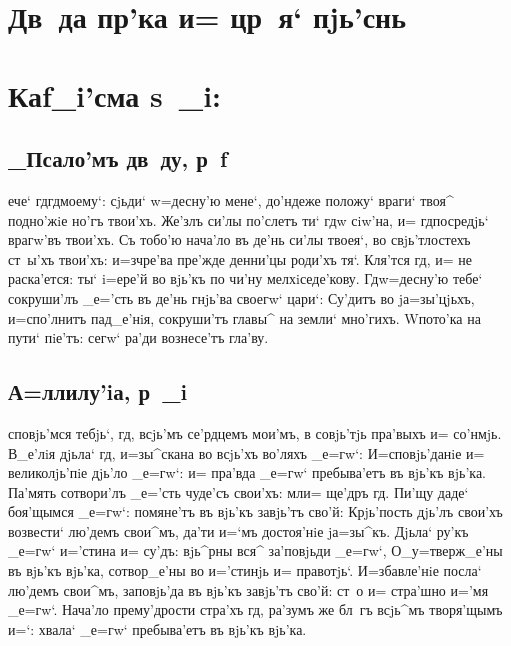 \documentclass[12pt,a6paper,twoside,dvips,civil=antiqua,cs=izhitsa]{hipbook}
\begin{document}
\csendpict

\clearpage
\hdrcrosspage

\section{{\Large Дв~да пр'ка и= цр~я` пjь'снь}}
\section[Каf_i'сма s~_i]{Каf_i'сма s~_i:}

\subsection{_Псало'мъ дв~ду, р~f}

ече` гд гд моему`: сjьди` w=десну'ю мене`, до'ндеже  положу`
враги` твоя^ подно'жiе но'гъ твои'хъ. Же'злъ си'лы по'слетъ ти` гд w\т
сiw'на, и= гд посредjь` врагw'въ твои'хъ. Съ тобо'ю нача'ло въ де'нь
си'лы твоея`, во свjь'тлостехъ ст~ы'хъ твои'хъ: и=з\ъ чре'ва пре'жде денни'цы
роди'хъ тя`. Кля'тся гд, и= не раска'ется: ты` i=ере'й во вjь'къ по чи'ну
мелхiседе'кову. Гд w=десну'ю тебе` сокруши'лъ _е='сть въ де'нь гнjь'ва
своегw` цари`: Су'дитъ во jа=зы'цjьхъ, и=спо'лнитъ пад_е'нiя, сокруши'тъ
главы^ на земли` мно'гихъ. W\т пото'ка на пути` пiе'тъ: сегw` ра'ди вознесе'тъ
гла'ву.

\delimpict

\subsection{А=ллилу'iа, р~_i}

сповjь'мся тебjь`, гд, всjь'мъ се'рдцемъ мои'мъ, в совjь'тjь
пра'выхъ и= со'нмjь. В_е'лiя дjьла` гд, и=зы^скана во всjь'хъ во'ляхъ
_е=гw`: И=сповjь'данiе и= великолjь'пiе дjь'ло _е=гw`: и= пра'вда _е=гw`
пребыва'етъ въ вjь'къ вjь'ка. Па'мять сотвори'лъ _е='сть чуде'съ свои'хъ:
мл и= ще'дръ гд. Пи'щу даде` боя'щымся _е=гw`: помяне'тъ въ вjь'къ
завjь'тъ сво'й: Крjь'пость дjь'лъ свои'хъ возвести` лю'демъ свои^мъ, да'ти
и=`мъ достоя'нiе jа=зы^къ. Дjьла` ру'къ _е=гw` и='стина и= су'дъ: вjь^рны вся^
за'повjьди _е=гw`, О_у=тверж_е'ны въ вjь'къ вjь'ка, сотвор_е'ны во
и='стинjь и= правотjь`. И=збавле'нiе посла` лю'демъ свои^мъ, заповjь'да въ
вjь'къ завjь'тъ сво'й: ст~о и= стра'шно и='мя _е=гw`. Нача'ло
прему'дрости стра'хъ гд, ра'зумъ же бл~гъ всjь^мъ творя'щымъ и=`: хвала`
_е=гw` пребыва'етъ въ вjь'къ вjь'ка.
\end{document}
